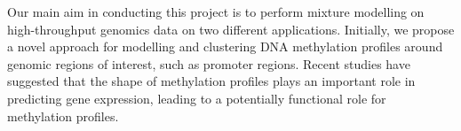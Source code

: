 Our main aim in conducting this project is to perform mixture modelling on high-throughput genomics data on two different applications. Initially, we propose a novel approach for modelling and clustering DNA methylation profiles around genomic regions of interest, such as promoter regions. Recent studies have suggested that the shape of methylation profiles plays an important role in predicting gene expression, leading to a potentially functional role for methylation profiles. 



